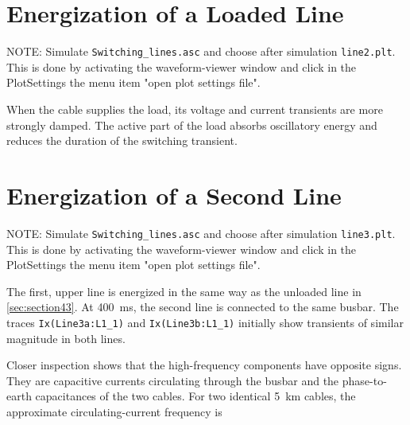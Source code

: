 \section{Energization of a Loaded Line}
\label{sec:Section44}
NOTE: Simulate \texttt{Switching\_lines.asc} and choose after simulation \texttt{line2.plt}.
This is done by activating the waveform-viewer window and click in the PlotSettings the menu item "open plot settings file".
  
When the cable supplies the load, its voltage and current transients are more
strongly damped. The active part of the load absorbs oscillatory energy and
reduces the duration of the switching transient.

\section{Energization of a Second Line}
\label{sec:section45}
NOTE: Simulate \texttt{Switching\_lines.asc} and choose after simulation \texttt{line3.plt}.
This is done by activating the waveform-viewer window and click in the PlotSettings the menu item "open plot settings file".
  
The first, upper line is energized in the same way as the unloaded line in
\cref{sec:section43}. At \SI{400}{\milli\second}, the second line
is connected to the same busbar. The traces \texttt{Ix(Line3a:L1\_1)} and
\texttt{Ix(Line3b:L1\_1)} initially show transients of similar magnitude in both
lines.

Closer inspection shows that the high-frequency components have opposite
signs. They are capacitive currents circulating through the busbar and
the phase-to-earth capacitances of the two cables. For two identical
\SI{5}{\kilo\metre} cables, the approximate circulating-current frequency is

